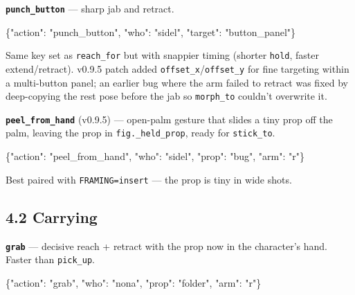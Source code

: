 \documentclass[
  12pt,
  letterpaper,
]{book}
\newenvironment{Shaded}{}{}
\newcommand{\DataTypeTok}[1]{\textcolor[rgb]{0.56,0.13,0.00}{#1}}
\newcommand{\FunctionTok}[1]{\textcolor[rgb]{0.02,0.16,0.49}{#1}}
\newcommand{\StringTok}[1]{\textcolor[rgb]{0.25,0.44,0.63}{#1}}
\begin{document}
\textbf{\texttt{punch\_button}} --- sharp jab and retract.

\begin{Shaded}
\begin{Highlighting}[]
\FunctionTok{\{}\DataTypeTok{"action"}\FunctionTok{:} \StringTok{"punch\_button"}\FunctionTok{,} \DataTypeTok{"who"}\FunctionTok{:} \StringTok{"sidel"}\FunctionTok{,} \DataTypeTok{"target"}\FunctionTok{:} \StringTok{"button\_panel"}\FunctionTok{\}}
\end{Highlighting}
\end{Shaded}

Same key set as \texttt{reach\_for} but with snappier timing (shorter
\texttt{hold}, faster extend/retract). v0.9.5 patch added
\texttt{offset\_x}/\texttt{offset\_y} for fine targeting within a
multi-button panel; an earlier bug where the arm failed to retract was
fixed by deep-copying the rest pose before the jab so \texttt{morph\_to}
couldn't overwrite it.

\textbf{\texttt{peel\_from\_hand}} (v0.9.5) --- open-palm gesture that
slides a tiny prop off the palm, leaving the prop in
\texttt{fig.\_held\_prop}, ready for \texttt{stick\_to}.

\begin{Shaded}
\begin{Highlighting}[]
\FunctionTok{\{}\DataTypeTok{"action"}\FunctionTok{:} \StringTok{"peel\_from\_hand"}\FunctionTok{,} \DataTypeTok{"who"}\FunctionTok{:} \StringTok{"sidel"}\FunctionTok{,} \DataTypeTok{"prop"}\FunctionTok{:} \StringTok{"bug"}\FunctionTok{,} \DataTypeTok{"arm"}\FunctionTok{:} \StringTok{"r"}\FunctionTok{\}}
\end{Highlighting}
\end{Shaded}

Best paired with \texttt{FRAMING=insert} --- the prop is tiny in wide
shots.

\subsection{4.2 Carrying}\label{carrying}

\textbf{\texttt{grab}} --- decisive reach + retract with the prop now in
the character's hand. Faster than \texttt{pick\_up}.

\begin{Shaded}
\begin{Highlighting}[]
\FunctionTok{\{}\DataTypeTok{"action"}\FunctionTok{:} \StringTok{"grab"}\FunctionTok{,} \DataTypeTok{"who"}\FunctionTok{:} \StringTok{"nona"}\FunctionTok{,} \DataTypeTok{"prop"}\FunctionTok{:} \StringTok{"folder"}\FunctionTok{,} \DataTypeTok{"arm"}\FunctionTok{:} \StringTok{"r"}\FunctionTok{\}}
\end{Highlighting}
\end{Shaded}
\end{document}

